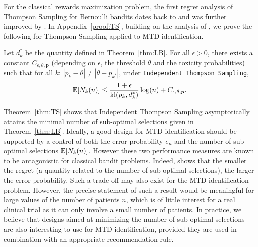 For the classical rewards maximization problem, the first regret analysis of Thompson Sampling for Bernoulli bandits dates back to \cite{AGCOLT12} and was further improved by \cite{ALT12,AGAISTAT13}. %
In Appendix~\ref{proof:TS}, building on the analysis of \cite{AGAISTAT13}, we prove the following for Thompson Sampling applied to MTD identification. 

\begin{theorem}\label{thm:TS}  Let $d_k^*$ be the quantity defined in Theorem~\ref{thm:LB}. For all $\epsilon >0$, there exists a constant $C_{\epsilon,\theta,\bm p}$ (depending on $\epsilon$, the threshold $\theta$ and the toxicity probabilities) such that for all $k$:  $|p_k - \theta| \neq |\theta - p_{k^*}|$, under \texttt{Independent Thompson Sampling},\[
\mathbb{E}[N_{k}(n)]  \leq \frac{1 + \epsilon}{\mathrm{kl}(p_k,d_k^*)} \log(n) + C_{\epsilon,\theta,\bm p}.\]
\end{theorem}

Theorem~\ref{thm:TS} shows that Independent Thompson Sampling asymptotically attains the minimal number of sub-optimal selections given in Theorem~\ref{thm:LB}. Ideally, a good design for MTD identification should be supported by a control of both the error probability $e_n$ and the number of sub-optimal selections $\mathbb{E}[N_k(n)]$. However these two performance measures are known to be antagonistic for classical bandit problems. Indeed, \cite{Bubeckal11} shows that the smaller the regret (a quantity related to the number of sub-optimal selections), the larger the error probability. Such a trade-off may also exist for the MTD identification problem. However, the precise statement of such a result would be meaningful for large values of the number of patients $n$, which is of little interest for a real clinical trial as it can only involve a small number of patients. In practice, we believe that designs aimed at minimizing the number of sub-optimal selections are also interesting to use for MTD identification, provided they are used in combination with an appropriate recommendation rule. 

